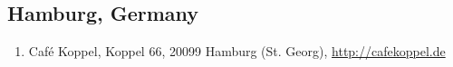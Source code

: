 \subsection{Hamburg, Germany}
\begin{enumerate}
 \item Café Koppel, Koppel 66, 20099 Hamburg (St. Georg), \href{http://cafekoppel.de/}{http://cafekoppel.de}

\end{enumerate}
